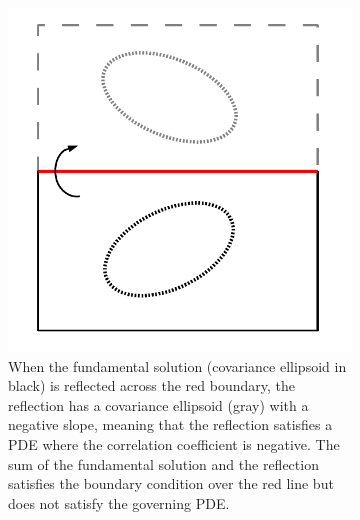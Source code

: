 \begin{figure}[htbp]
        \centering
        \begin{subfigure}[t]{0.4\textwidth}
                \includegraphics[width=\textwidth]{./chapter-3-two-dimensional-case/unmodified-reflection.pdf}
                \caption{When the fundamental solution (covariance ellipsoid in black) is reflected across the red boundary, the reflection has a covariance ellipsoid (gray) with a negative slope, meaning that the reflection satisfies a PDE where the correlation coefficient is negative. The sum of the fundamental solution and the reflection satisfies the boundary condition over the red line but does not satisfy the governing PDE.}
                \label{fig:unmodified-reflection}
        \end{subfigure}%
        \quad %
        \begin{subfigure}[t]{0.4\textwidth}

\end{subfigure}
\end{figure}
